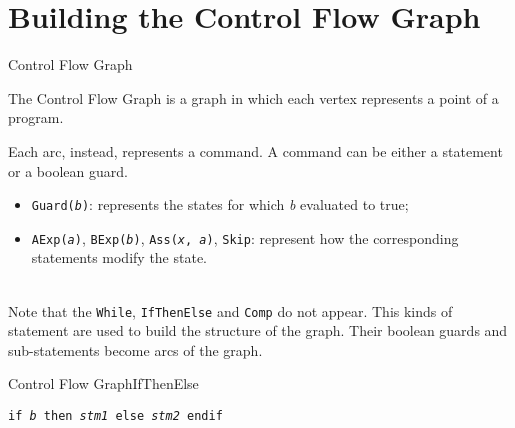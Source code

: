\documentclass{beamer}
\begin{document}
\section{Building the Control Flow Graph}

\begin{frame}{Control Flow Graph}

    The Control Flow Graph is a graph in which each vertex represents a point of a program.

    Each arc, instead, represents a command.
    A command can be either a statement or a boolean guard.

    \begin{itemize}
        \item \texttt{Guard(\textit{b})}: represents the states for which \textit{b} evaluated to true;
        \item \texttt{AExp(\textit{a})}, \texttt{BExp(\textit{b})}, \texttt{Ass(\textit{x}, \textit{a})}, \texttt{Skip}: represent how the corresponding statements modify the state.
    \end{itemize}

    ~\\
    Note that the \texttt{While}, \texttt{IfThenElse} and \texttt{Comp} do not appear.
    This kinds of statement are used to build the structure of the graph.
    Their boolean guards and sub-statements become arcs of the graph.

\end{frame}

\begin{frame}{Control Flow Graph}{IfThenElse}

    \texttt{if \textit{b} then \textit{stm1} else \textit{stm2} endif}

    ~\\~\\\centering

\end{frame}
\end{document}
